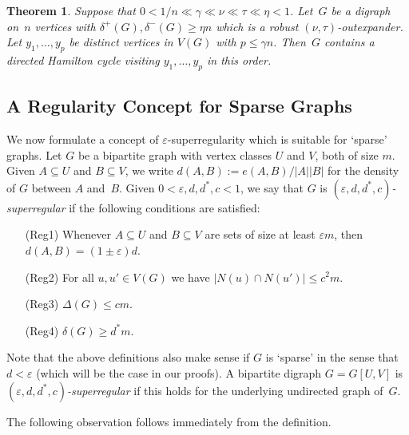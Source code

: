 \documentclass{memo-l}
\newtheorem{thm}[firstthm]{Theorem}
\newtheorem{prop}[firstthm]{Proposition}
\def\COMMENT#1{}
\def\eps{\varepsilon}
\numberwithin{section}{chapter}
\numberwithin{equation}{section}
\numberwithin{firstthm}{section}
\numberwithin{figure}{section}
\begin{document}
{\begin{thm}\label{expanderthm}
Suppose that $0 < 1/n\ll \gamma \ll \nu \ll \tau\ll\eta<1$. Let~$G$ be a digraph on~$n$ vertices with
$\delta^+(G), \delta^-(G)\ge \eta n$ which is a robust $(\nu,\tau)$-outexpander. 
Let $y_1, \dots, y_p$ be distinct vertices in $V(G)$ with $p \le \gamma n$.
Then~$G$ contains a directed Hamilton cycle visiting $y_1, \dots, y_p$ in this  order.
\end{thm}


\subsection{A Regularity Concept for Sparse Graphs} \label{sec:reg}
We now formulate a concept of $\eps$-superregularity which is suitable for `sparse' graphs.
Let $G$ be a bipartite graph with vertex classes $U$ and $V$, both of size $m$.
Given $A\subseteq U$ and $B\subseteq V$, we write $d(A,B):=e(A,B)/|A||B|$ for the density of $G$
between $A$ and~$B$. Given $0<\eps,d,d^*,c<1$, we say that $G$ is \emph{$(\eps,d,d^*,c)$-superregular} if the following conditions are satisfied:
\begin{itemize}
\item[(Reg1)] Whenever $A\subseteq U$ and $B\subseteq V$ are sets of size at least $\eps m$, then
$d(A,B)=(1\pm \eps)d$.
\item[(Reg2)] For all $u,u'\in V(G)$ we have $|N(u)\cap N(u')|\le c^2m$.%
	\COMMENT{Previously, we had the following statement, which is the same.
For all $u,u'\in U$ we have $|N(u)\cap N(u')|\le c^2m$. Similarly, for all $v,v'\in V$ we have $|N(v)\cap N(v')|\le c^2m$.}
\item[(Reg3)] $\Delta(G)\le cm$.
\item[(Reg4)] $\delta(G)\ge d^*m$.
\end{itemize}
Note that the above definitions also make sense if $G$ is `sparse' in the sense that $d<\eps$ (which will be the case in our proofs).
A bipartite digraph $G=G[U,V]$ is \emph{$(\eps,d,d^*,c)$-superregular} if this holds for
the underlying undirected graph of~$G$.

The following observation follows immediately from the definition.

}
\end{document}
